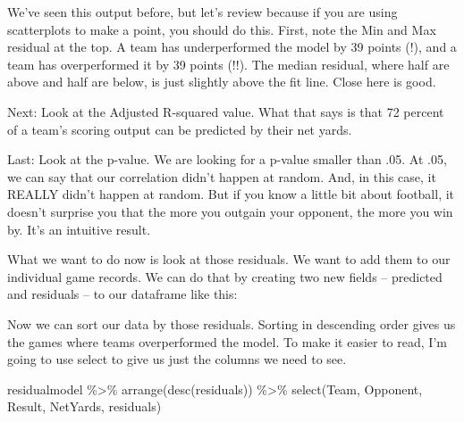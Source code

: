 \documentclass[
]{book}
\newenvironment{Shaded}{\begin{snugshade}}{\end{snugshade}}
\newcommand{\FunctionTok}[1]{\textcolor[rgb]{0.00,0.00,0.00}{#1}}
\newcommand{\NormalTok}[1]{#1}
\newcommand{\OtherTok}[1]{\textcolor[rgb]{0.56,0.35,0.01}{#1}}
\newcommand{\SpecialCharTok}[1]{\textcolor[rgb]{0.00,0.00,0.00}{#1}}
\begin{document}
We've seen this output before, but let's review because if you are using scatterplots to make a point, you should do this. First, note the Min and Max residual at the top. A team has underperformed the model by 39 points (!), and a team has overperformed it by 39 points (!!). The median residual, where half are above and half are below, is just slightly above the fit line. Close here is good.

Next: Look at the Adjusted R-squared value. What that says is that 72 percent of a team's scoring output can be predicted by their net yards.

Last: Look at the p-value. We are looking for a p-value smaller than .05. At .05, we can say that our correlation didn't happen at random. And, in this case, it REALLY didn't happen at random. But if you know a little bit about football, it doesn't surprise you that the more you outgain your opponent, the more you win by. It's an intuitive result.

What we want to do now is look at those residuals. We want to add them to our individual game records. We can do that by creating two new fields -- predicted and residuals -- to our dataframe like this:

\begin{Shaded}
\end{Shaded}

Now we can sort our data by those residuals. Sorting in descending order gives us the games where teams overperformed the model. To make it easier to read, I'm going to use select to give us just the columns we need to see.

\begin{Shaded}
\begin{Highlighting}[]
\NormalTok{residualmodel }\SpecialCharTok{\%\textgreater{}\%} \FunctionTok{arrange}\NormalTok{(}\FunctionTok{desc}\NormalTok{(residuals)) }\SpecialCharTok{\%\textgreater{}\%} \FunctionTok{select}\NormalTok{(Team, Opponent, Result, NetYards, residuals)}
\end{Highlighting}
\end{Shaded}
\end{document}
